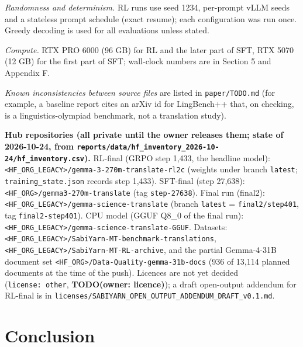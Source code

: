 \emph{Randomness and determinism.} RL runs use seed 1234, per-prompt vLLM seeds and a stateless prompt schedule (exact resume); each configuration was run once. Greedy decoding is used for all evaluations unless stated.

\emph{Compute.} RTX PRO 6000 (96 GB) for RL and the later part of SFT, RTX 5070 (12 GB) for the first part of SFT; wall-clock numbers are in Section 5 and Appendix F.

\emph{Known inconsistencies between source files} are listed in \texttt{paper/TODO.md} (for example, a baseline report cites an arXiv id for LingBench++ that, on checking, is a linguistics-olympiad benchmark, not a translation study).

\textbf{Hub repositories (all private until the owner releases them; state of 2026-10-24, from \texttt{reports/data/hf\_inventory\_2026-10-24/hf\_inventory.csv}).} RL-final (GRPO step 1,433, the headline model): \texttt{<HF_ORG_LEGACY>/gemma-3-270m-translate-rl2c} (weights under branch \texttt{latest}; \texttt{training\_state.json} records step 1,433). SFT-final (step 27,638): \texttt{<HF_ORG>/gemma3-270m-translate} (tag \texttt{step-27638}). Final run (final2): \texttt{<HF_ORG_LEGACY>/gemma-science-translate} (branch \texttt{latest} = \texttt{final2/step401}, tag \texttt{final2-step401}). CPU model (GGUF Q8\_0 of the final run): \texttt{<HF_ORG_LEGACY>/gemma-science-translate-GGUF}. Datasets: \texttt{<HF_ORG_LEGACY>/SabiYarn-MT-benchmark-translations}, \texttt{<HF_ORG_LEGACY>/SabiYarn-MT-RL-archive}, and the partial Gemma-4-31B document set \texttt{<HF_ORG>/Data-Quality-gemma-31b-docs} (936 of 13,114 planned documents at the time of the push). Licences are not yet decided (\texttt{license:\ other}, {\color{red}\textbf{TODO(owner: licence)}}); a draft open-output addendum for RL-final is in \texttt{licenses/SABIYARN\_OPEN\_OUTPUT\_ADDENDUM\_DRAFT\_v0.1.md}.

\section{Conclusion}\label{conclusion}

